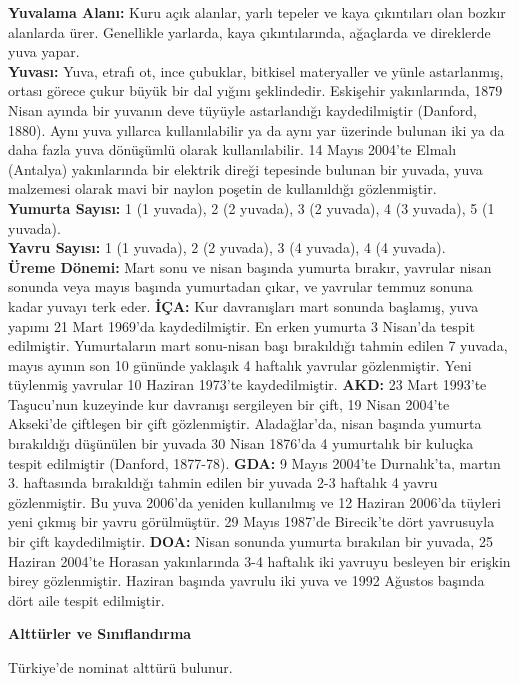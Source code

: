 \documentclass[
  a4paper,
  DIV=11,
  numbers=noendperiod]{scrreprt}
\begin{document}
\textbf{Yuvalama Alanı:} Kuru açık alanlar, yarlı tepeler ve kaya
çıkıntıları olan bozkır alanlarda ürer. Genellikle yarlarda, kaya
çıkıntılarında, ağaçlarda ve direklerde yuva yapar.\\
\textbf{Yuvası:} Yuva, etrafı ot, ince çubuklar, bitkisel materyaller ve
yünle astarlanmış, ortası görece çukur büyük bir dal yığını şeklindedir.
Eskişehir yakınlarında, 1879 Nisan ayında bir yuvanın deve tüyüyle
astarlandığı kaydedilmiştir (Danford, 1880). Aynı yuva yıllarca
kullanılabilir ya da aynı yar üzerinde bulunan iki ya da daha fazla yuva
dönüşümlü olarak kullanılabilir. 14 Mayıs 2004'te Elmalı (Antalya)
yakınlarında bir elektrik direği tepesinde bulunan bir yuvada, yuva
malzemesi olarak mavi bir naylon poşetin de kullanıldığı gözlenmiştir.\\
\textbf{Yumurta Sayısı:} 1 (1 yuvada), 2 (2 yuvada), 3 (2 yuvada), 4 (3
yuvada), 5 (1 yuvada).\\
\textbf{Yavru Sayısı:} 1 (1 yuvada), 2 (2 yuvada), 3 (4 yuvada), 4 (4
yuvada).\\
\textbf{Üreme Dönemi:} Mart sonu ve nisan başında yumurta bırakır,
yavrular nisan sonunda veya mayıs başında yumurtadan çıkar, ve yavrular
temmuz sonuna kadar yuvayı terk eder. \textbf{İÇA:} Kur davranışları
mart sonunda başlamış, yuva yapımı 21 Mart 1969'da kaydedilmiştir. En
erken yumurta 3 Nisan'da tespit edilmiştir. Yumurtaların mart sonu-nisan
başı bırakıldığı tahmin edilen 7 yuvada, mayıs ayının son 10 gününde
yaklaşık 4 haftalık yavrular gözlenmiştir. Yeni tüylenmiş yavrular 10
Haziran 1973'te kaydedilmiştir. \textbf{AKD:} 23 Mart 1993'te Taşucu'nun
kuzeyinde kur davranışı sergileyen bir çift, 19 Nisan 2004'te Akseki'de
çiftleşen bir çift gözlenmiştir. Aladağlar'da, nisan başında yumurta
bırakıldığı düşünülen bir yuvada 30 Nisan 1876'da 4 yumurtalık bir
kuluçka tespit edilmiştir (Danford, 1877-78). \textbf{GDA:} 9 Mayıs
2004'te Durnalık'ta, martın 3. haftasında bırakıldığı tahmin edilen bir
yuvada 2-3 haftalık 4 yavru gözlenmiştir. Bu yuva 2006'da yeniden
kullanılmış ve 12 Haziran 2006'da tüyleri yeni çıkmış bir yavru
görülmüştür. 29 Mayıs 1987'de Birecik'te dört yavrusuyla bir çift
kaydedilmiştir. \textbf{DOA:} Nisan sonunda yumurta bırakılan bir
yuvada, 25 Haziran 2004'te Horasan yakınlarında 3-4 haftalık iki yavruyu
besleyen bir erişkin birey gözlenmiştir. Haziran başında yavrulu iki
yuva ve 1992 Ağustos başında dört aile tespit edilmiştir.

\textbf{Alttürler ve Sınıflandırma}

Türkiye'de nominat alttürü bulunur.
\end{document}
